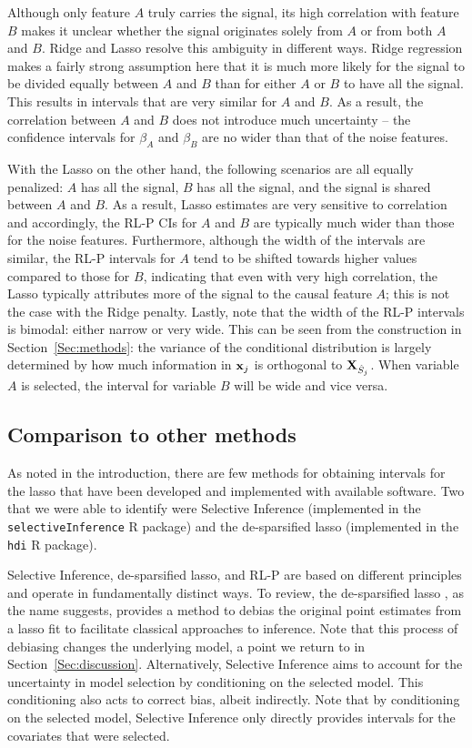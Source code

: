 Although only feature $A$ truly carries the signal, its high correlation with feature $B$ makes it unclear whether the signal originates solely from $A$ or from both $A$ and $B$. Ridge and Lasso resolve this ambiguity in different ways. Ridge regression makes a fairly strong assumption here that it is much more likely for the signal to be divided equally between $A$ and $B$ than for either $A$ or $B$ to have all the signal. This results in intervals that are very similar for $A$ and $B$. As a result, the correlation between $A$ and $B$ does not introduce much uncertainty -- the confidence intervals for $\beta_A$ and $\beta_B$ are no wider than that of the noise features.

With the Lasso on the other hand, the following scenarios are all equally penalized: $A$ has all the signal, $B$ has all the signal, and the signal is shared between $A$ and $B$. As a result, Lasso estimates are very sensitive to correlation and accordingly, the RL-P CIs for $A$ and $B$ are typically much wider than those for the noise features. Furthermore, although the width of the intervals are similar, the RL-P intervals for $A$ tend to be shifted towards higher values compared to those for $B$, indicating that even with very high correlation, the Lasso typically attributes more of the signal to the causal feature $A$; this is not the case with the Ridge penalty. Lastly, note that the width of the RL-P intervals is bimodal: either narrow or very wide. This can be seen from the construction in Section~\ref{Sec:methods}: the variance of the conditional distribution is largely determined by how much information in $\mathbf{x}_j$ is orthogonal to $\mathbf{X}_{\hat{S}_j}$. When variable $A$ is selected, the interval for variable $B$ will be wide and vice versa.

\subsection{Comparison to other methods} \label{Sec:Comparison}

As noted in the introduction, there are few methods for obtaining intervals for the lasso that have been developed and implemented with available software. Two that we were able to identify were Selective Inference (implemented in the \texttt{selectiveInference} R package) and the de-sparsified lasso (implemented in the \texttt{hdi} R package).

Selective Inference, de-sparsified lasso, and RL-P are based on different principles and operate in fundamentally distinct ways. To review, the de-sparsified lasso \citep{ZhangZhang2014}, as the name suggests, provides a method to debias the original point estimates from a lasso fit to facilitate classical approaches to inference. Note that this process of debiasing changes the underlying model, a point we return to in Section~\ref{Sec:discussion}. Alternatively, Selective Inference \citep{Lee2016,Tibshirani2016} aims to account for the uncertainty in model selection by conditioning on the selected model. This conditioning also acts to correct bias, albeit indirectly. Note that by conditioning on the selected model, Selective Inference only directly provides intervals for the covariates that were selected.

